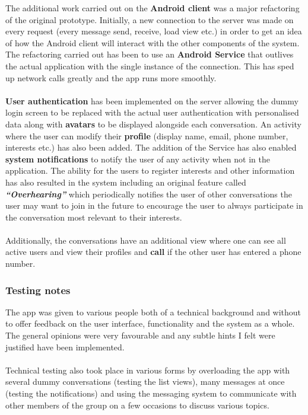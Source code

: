 \documentclass[12p, a4paper, onecolumn]{report}
\begin{document}
The additional work carried out on the \textbf{Android client} was a major refactoring of the original prototype. Initially, a new connection to the server was made on every request (every message send, receive, load view etc.) in order to get an idea of how the Android client will interact with the other components of the system. The refactoring carried out has been to use an \textbf{Android Service} that outlives the actual application with the single instance of the connection. This has sped up network calls greatly and the app runs more smoothly.  \\ \\
\textbf{User authentication} has been implemented on the server allowing the dummy login screen to be replaced with the actual user authentication with personalised data along with \textbf{avatars} to be displayed alongside each conversation. An activity where the user can modify their \textbf{profile} (display name, email, phone number, interests etc.) has also been added. The addition of the Service has also enabled \textbf{system notifications} to notify the user of any activity when not in the application. The ability for the users to register interests and other information has also resulted in the system including an original feature called \emph{\textbf{“Overhearing”}} which periodically notifies the user of other conversations the user may want to join in the future to encourage the user to always participate in the conversation most relevant to their interests.  \\ \\
Additionally, the conversations have an additional view where one can see all active users and view their profiles and \textbf{call} if the other user has entered a phone number.

\subsubsection{Testing notes}

The app was given to various people both of a technical background and without to offer feedback on the user interface, functionality and the system as a whole. The general opinions were very favourable and any subtle hints I felt were justified have been implemented.\\ \\
Technical testing also took place in various forms by overloading the app with several dummy conversations (testing the list views), many messages at once (testing the notifications) and using the messaging system to communicate with other members of the group on a few occasions to discuss various topics.
\end{document}
